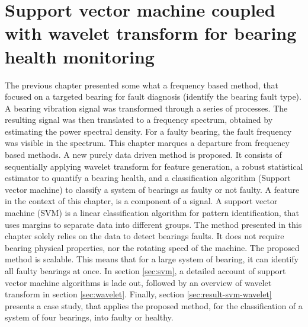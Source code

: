 \documentclass[../Main/thesis.tex]{subfiles}
\begin{document}
\chapter[Support vector machine coupled with wavelet transform for bearing health monitoring]{Support vector machine coupled with wavelet transform for bearing health monitoring}
\label{sec:waveletandsvm}
The previous chapter presented some what a frequency based method, that focused on a targeted bearing for fault diagnosis (identify the bearing fault type). A bearing vibration signal was transformed through a series of  processes. The resulting signal was then translated to a frequency spectrum, obtained by estimating the power spectral density. For a faulty bearing, the fault frequency was visible in the spectrum.
\justify
This chapter marques a departure from frequency based methods. A new purely data driven method is proposed. It consists of sequentially applying wavelet transform for feature generation, a robust statistical estimator to quantify a bearing health, and a classification algorithm (Support vector machine) to classify a system of bearings as faulty or not faulty. A feature in the context of this chapter, is a component of a signal. A support vector machine (SVM) is a linear classification algorithm for pattern identification, that uses margins to separate data into different groups.
\justify
The method presented in this chapter solely relies on the data to detect bearings faults. It does not require bearing physical properties, nor the rotating speed of the machine. The proposed method is scalable. This means that for a large system of bearing, it can identify all faulty bearings at once.
In section \ref{sec:svm}, a detailed account of support vector machine algorithms is lade out, followed by an overview of wavelet transform in section \ref{sec:wavelet}. Finally, section \ref{sec:result-svm-wavelet} presents a case study, that applies the proposed method, for the classification of a system of four bearings, into faulty or healthy.





\end{document}

